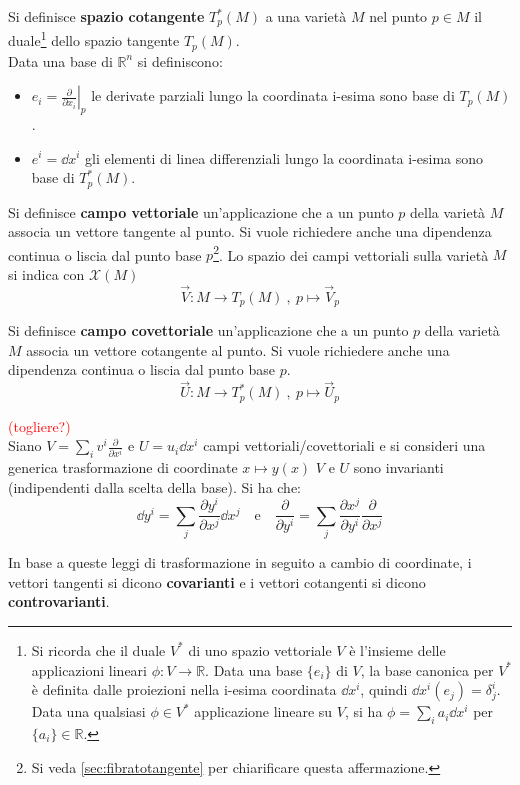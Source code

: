 Si definisce \textbf{spazio cotangente} $T_p^*(M)$ a una varietà $M$ nel punto
$p \in M$ il duale\footnote{
   Si ricorda che il duale $V^*$ di uno spazio vettoriale $V$ è l'insieme
   delle applicazioni lineari $\phi : V \to \mathbb{R}$. Data una base $\{e_i\}$ di $V$,
   la base canonica per $V^*$ è definita dalle proiezioni nella i-esima coordinata $\dd x^i$,
   quindi $\dd x^i(e_j)=\delta^i_j$. Data una qualsiasi $\phi\in V^*$ applicazione lineare
   su $V$, si ha $\phi = \sum_i a_i \dd x^i$ per $\{a_i\}\in\mathbb{R}$. }
dello spazio tangente $T_p(M)$.\\

Data una base di $\mathbb{R}^n$ si definiscono:
\begin{itemize}
   \item $ e_i = \left. \frac{\partial}{\partial x_i}\right |_p $
      le derivate parziali lungo la coordinata i-esima sono base di $T_p(M)$.
   \item $ e^i = \dd x^i $ gli elementi di linea differenziali lungo la
      coordinata i-esima sono base di $T_p^*(M)$.
\end{itemize}

Si definisce \textbf{campo vettoriale} un'applicazione che a un punto $p$
della varietà $M$ associa un vettore tangente al punto. Si vuole richiedere anche
una dipendenza continua o liscia dal punto base $p$\footnote{Si veda \ref{sec:fibratotangente}
per chiarificare questa affermazione.}.
Lo spazio dei campi vettoriali sulla varietà $M$ si indica con $\mathcal{X}(M)$
$$ \vec V : M \to T_p(M) \: ,\: p \mapsto \vec V _p $$

Si definisce \textbf{campo covettoriale} un'applicazione che a un punto $p$
della varietà $M$ associa un vettore cotangente al punto. Si vuole richiedere anche
una dipendenza continua o liscia dal punto base $p$.
$$ \vec U : M \to T_p^*(M) \: ,\: p \mapsto \vec U _p $$

\textcolor{red}{(togliere?)}\\
Siano $V = \sum_i v^i\frac{\partial}{\partial x^i}$ e $U = u_i \dd x^i$ campi
vettoriali/covettoriali e si consideri una generica trasformazione di coordinate
$x \mapsto y(x)$ $V$ e $U$ sono invarianti (indipendenti dalla scelta della base).
Si ha che:
$$
   \dd y^i = \sum_j \frac{\partial y^i}{\partial x^j} \dd x^j \mathrm{\quad e \quad}
   \frac{\partial}{\partial y^i} = \sum_j \frac{\partial x^j}{\partial y^i}
      \frac{\partial }{\partial x^j}
$$

In base a queste leggi di trasformazione in seguito a cambio di coordinate,
i vettori tangenti si dicono \textbf{covarianti} e i vettori cotangenti
si dicono \textbf{controvarianti}.\\

